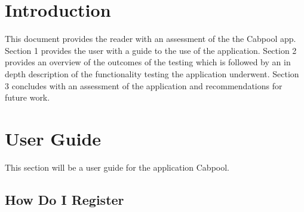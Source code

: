 \documentclass[english]{article}
\begin{document}
\vspace*{\fill} 
\vspace*{\fill} 

\newpage

\tableofcontents

\newpage

\setcounter{page}{1}
\raggedright    

\section{Introduction}
\label{sec:introduction}

This document provides the reader with an assessment of the the Cabpool app. Section 1 provides the user with a guide to the use of the application. Section 2 provides an overview of the outcomes of the testing which is followed by an in depth description of the functionality testing the application underwent. Section 3 concludes with an assessment of the application and recommendations for future work. 


\section{User Guide}
\label{sec:user_guide}
This section will be a user guide for the application Cabpool.

\subsection{How Do I Register}
\end{document}
